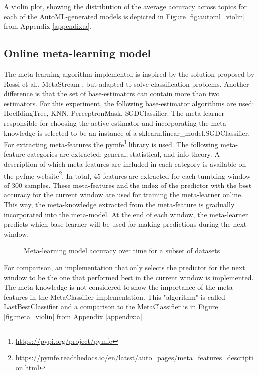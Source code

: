 \documentclass{sig-alternate-br}
\begin{document}
A violin plot, showing the distribution of the average accuracy across topics for each of the AutoML-generated models is depicted in Figure \ref{fig:automl_violin} from Appendix \ref{appendix:a}.

\vspace{1cm}
\subsection{Online meta-learning model}

The meta-learning algorithm implemented is inspired by the solution proposed by Rossi et al., MetaStream \cite{rossi2014metastream}, but adapted to solve classification problems. Another difference is that the set of base-estimators can contain more than two estimators. For this experiment, the following base-estimator algorithms are used: HoeffdingTree, KNN, PerceptronMask, SGDClassifier. The meta-learner responsible for choosing the active estimator and incorporating the meta-knowledge is selected to be an instance of a sklearn.linear\_model.SGDClassifier. For extracting meta-features the pymfe\footnote{\url{https://pypi.org/project/pymfe}} library is used. The following meta-feature categories are extracted: general, statistical, and info-theory. A description of which meta-features are included in each category is available on the pyfme website\footnote{\url{https://pymfe.readthedocs.io/en/latest/auto_pages/meta_features_description.html}}. In total, 45 features are extracted for each tumbling window of 300 samples. These meta-features and the index of the predictor with the best accuracy for the current window are used for training the meta-learner online. This way, the meta-knowledge extracted from the meta-feature is gradually incorporated into the meta-model. At the end of each window, the meta-learner predicts which base-learner will be used for making predictions during the next window. 

\begin{figure}[h]
\centering 
{}
\caption{Meta-learning model accuracy over time for a subset of datasets}
\label{fig:meta}
\end{figure}

For comparison, an implementation that only selects the predictor for the next window to be the one that performed best in the current window is implemented. The meta-knowledge is not considered to show the importance of the meta-features in the MetaClassifier implementation. This "algorithm" is called LastBestClassifier and a comparison to the MetaClassifier is in Figure \ref{fig:meta_violin} from Appendix \ref{appendix:a}.
\end{document}
